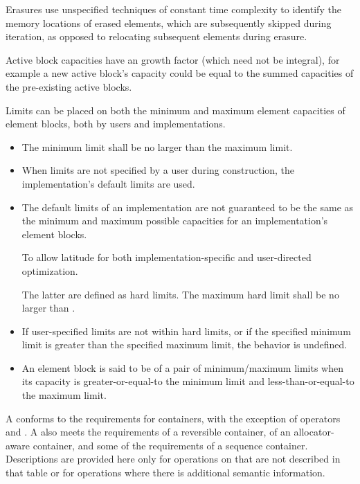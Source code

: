 \pnum
Erasures use unspecified techniques of constant time complexity
to identify the memory locations of erased elements,
which are subsequently skipped during iteration,
as opposed to relocating subsequent elements during erasure.

\pnum
Active block capacities have
an  growth factor
(which need not be integral),
for example a new active block's capacity could be equal to
the summed capacities of the pre-existing active blocks.

\pnum
Limits can be placed on
both the minimum and maximum element capacities of element blocks,
both by users and implementations.
\begin{itemize}
\item
The minimum limit shall be no larger than the maximum limit.
\item
When limits are not specified by a user during construction,
the implementation's default limits are used.
\item
The default limits of an implementation are not guaranteed to be the same as
the minimum and maximum possible capacities
for an implementation's element blocks.
\begin{note}
To allow latitude for
both implementation-specific and user-directed optimization.
\end{note}
The latter are defined as hard limits.
The maximum hard limit shall be no larger than
.
\item
If user-specified limits are not within hard limits, or
if the specified minimum limit is greater than the specified maximum limit,
the behavior is undefined.
\item
An element block is said to be 
of a pair of minimum/maximum limits
when its capacity is greater-or-equal-to the minimum limit and
less-than-or-equal-to the maximum limit.
\end{itemize}

\pnum
A  conforms to
the requirements for containers,
with the exception of operators \tcode{==} and \tcode{!=}.
A  also meets the requirements
of a reversible container,
of an allocator-aware container, and
some of the requirements of a sequence container.
Descriptions are provided here only for operations on 
that are not described in that table or for operations
where there is additional semantic information.


